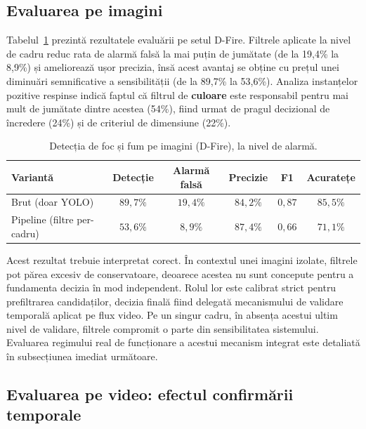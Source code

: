 \documentclass[../../main.tex]{subfiles}
\begin{document}
\subsection{Evaluarea pe imagini}
\label{subsec:foc_imagini}

Tabelul~\ref{tab:foc_imagini} prezintă rezultatele evaluării pe setul D-Fire. Filtrele aplicate la nivel de cadru reduc rata de alarmă falsă la mai puțin de jumătate (de la 19,4\% la 8,9\%) și ameliorează ușor precizia, însă acest avantaj se obține cu prețul unei diminuări semnificative a sensibilității (de la 89,7\% la 53,6\%). Analiza instanțelor pozitive respinse indică faptul că filtrul de \textbf{culoare} este responsabil pentru mai mult de jumătate dintre acestea (54\%), fiind urmat de pragul decizional de încredere (24\%) și de criteriul de dimensiune (22\%).

\begin{table}[h]
    \centering
    \caption{Detecția de foc și fum pe imagini (D-Fire), la nivel de alarmă.}
    \label{tab:foc_imagini}
    \begin{tabularx}{\textwidth}{>{\raggedright\arraybackslash}X c c c c c}
        \hline
        \textbf{Variantă} & \textbf{Detecție} & \textbf{Alarmă falsă} & \textbf{Precizie} &
        \textbf{F1} & \textbf{Acuratețe} \\
        \hline
        Brut (doar YOLO)             & $89{,}7\%$ & $19{,}4\%$ & $84{,}2\%$ & $0{,}87$ & $85{,}5\%$ \\
        Pipeline (filtre per-cadru)  & $53{,}6\%$ & $8{,}9\%$  & $87{,}4\%$ & $0{,}66$ & $71{,}1\%$ \\
        \hline
    \end{tabularx}
\end{table}

Acest rezultat trebuie interpretat corect. În contextul unei imagini izolate, filtrele pot părea excesiv de conservatoare, deoarece acestea nu sunt concepute pentru a fundamenta decizia în mod independent. Rolul lor este calibrat strict pentru prefiltrarea candidaților, decizia finală fiind delegată mecanismului de validare temporală aplicat pe flux video. Pe un singur cadru, în absența acestui ultim nivel de validare, filtrele compromit o parte din sensibilitatea sistemului. Evaluarea regimului real de funcționare a acestui mecanism integrat este detaliată în subsecțiunea imediat următoare.

\subsection{Evaluarea pe video: efectul confirmării temporale}
\label{subsec:foc_video}
\end{document}
